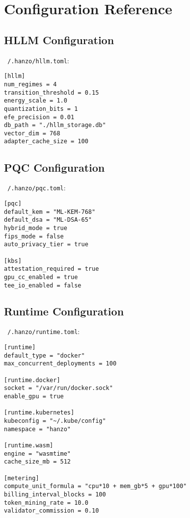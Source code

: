 \documentclass[11pt,twocolumn]{article}
\begin{document}
\section{Configuration Reference}

\subsection{HLLM Configuration}

\texttt{~/.hanzo/hllm.toml}:

\begin{lstlisting}
[hllm]
num_regimes = 4
transition_threshold = 0.15
energy_scale = 1.0
quantization_bits = 1
efe_precision = 0.01
db_path = "./hllm_storage.db"
vector_dim = 768
adapter_cache_size = 100
\end{lstlisting}

\subsection{PQC Configuration}

\texttt{~/.hanzo/pqc.toml}:

\begin{lstlisting}
[pqc]
default_kem = "ML-KEM-768"
default_dsa = "ML-DSA-65"
hybrid_mode = true
fips_mode = false
auto_privacy_tier = true

[kbs]
attestation_required = true
gpu_cc_enabled = true
tee_io_enabled = false
\end{lstlisting}

\subsection{Runtime Configuration}

\texttt{~/.hanzo/runtime.toml}:

\begin{lstlisting}
[runtime]
default_type = "docker"
max_concurrent_deployments = 100

[runtime.docker]
socket = "/var/run/docker.sock"
enable_gpu = true

[runtime.kubernetes]
kubeconfig = "~/.kube/config"
namespace = "hanzo"

[runtime.wasm]
engine = "wasmtime"
cache_size_mb = 512

[metering]
compute_unit_formula = "cpu*10 + mem_gb*5 + gpu*100"
billing_interval_blocks = 100
token_mining_rate = 10.0
validator_commission = 0.10
\end{lstlisting}
\end{document}
